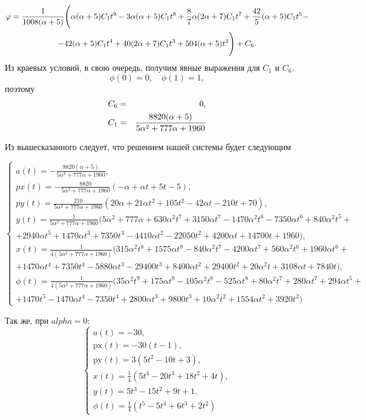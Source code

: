 \begin{enumerate}
\begin{multline}
\phi = \frac{1}{1008 (\alpha +5)} \Bigg(\alpha  (\alpha +5) C_1 t^9-3 \alpha  (\alpha +5) C_1 t^8+\frac{8}{7} \alpha  (2 \alpha +7) C_1 t^7
+ \frac{42}{5} (\alpha +5) C_1 t^5-\\ -42 (\alpha +5) C_1 t^4+40 (2 \alpha +7) C_1 t^3+504 (\alpha +5) t^2 \Bigg)
+C_6. \notag
\end{multline}
Из краевых условий, в свою очередь, получим явные выражения для $C_1$ и $C_6$.
\[ \phi(0) = 0,\quad \phi(1) = 1, 
\]
поэтому
\begin{eqnarray}
C_6 &=& 0, \notag \\
C_1 &=& \frac{8820 (\alpha +5)}{5 \alpha ^2+777 \alpha +1960} \notag
\end{eqnarray}
\end{enumerate}
Из вышесказанного следует, что решением нашей системы будет следующим

\[
\begin{cases}
a(t) = -\frac{8820 (\alpha +5)}{5 \alpha ^2+777 \alpha +1960},
\\
px(t) =  -\frac{8820}{5 \alpha ^2+777 \alpha +1960} (-\alpha +\alpha  t+5 t-5),
\\
py(t) = \frac{210}{5 \alpha ^2+777 \alpha +1960} \left(20 \alpha +21 \alpha  t^2+105 t^2-42 \alpha  t-210 t+70\right),
\\
y(t) = \frac{1}{5 \alpha ^2+777 \alpha +1960} \big(5 \alpha ^2+777 \alpha +630 \alpha ^2 t^7+3150 \alpha  t^7-1470 \alpha ^2 t^6-7350 \alpha  t^6+840 \alpha ^2 t^5+\\
+2940 \alpha  t^5+1470 \alpha  t^3+7350 t^3-4410 \alpha  t^2-22050 t^2+4200 \alpha  t+14700 t+1960 \big),
\\
x(t) = \frac{1}{4 \left(5 \alpha ^2+777 \alpha +1960\right)} \big(315 \alpha ^2 t^8+1575 \alpha  t^8-840 \alpha ^2 t^7-4200 \alpha  t^7+560 \alpha ^2 t^6+1960 \alpha  t^6+\\
+ 1470 \alpha  t^4+7350 t^4-5880 \alpha  t^3-29400 t^3+8400 \alpha  t^2+29400 t^2+20 \alpha ^2 t+3108 \alpha  t+7840 t \big),
\\
\phi (t) = \frac{1}{4 \left(5 \alpha ^2+777 \alpha +1960\right)} \big(35 \alpha ^2 t^9+175 \alpha  t^9-105 \alpha ^2 t^8-525 \alpha  t^8+80 \alpha ^2 t^7+280 \alpha  t^7+294 \alpha  t^5+\\
+1470 t^5-1470 \alpha  t^4-7350 t^4+2800 \alpha  t^3+9800 t^3+10 \alpha ^2 t^2+1554 \alpha  t^2+3920 t^2 \big)
\end{cases}
\]

Так же, при $alpha = 0$:
\[
\begin{cases}
a(t) = -30,\\
\text{px}(t)= -30 (t-1),\\
\text{py}(t)= 3 \left(5 t^2-10 t+3\right),\\
x(t)= \frac{1}{4} \left(5 t^4-20 t^3+18 t^2+4 t\right),\\
y(t)= 5 t^3-15 t^2+9 t+1,\\
\phi (t)= \frac{1}{4} \left(t^5-5 t^4+6 t^3+2 t^2\right)
\end{cases}
\]
